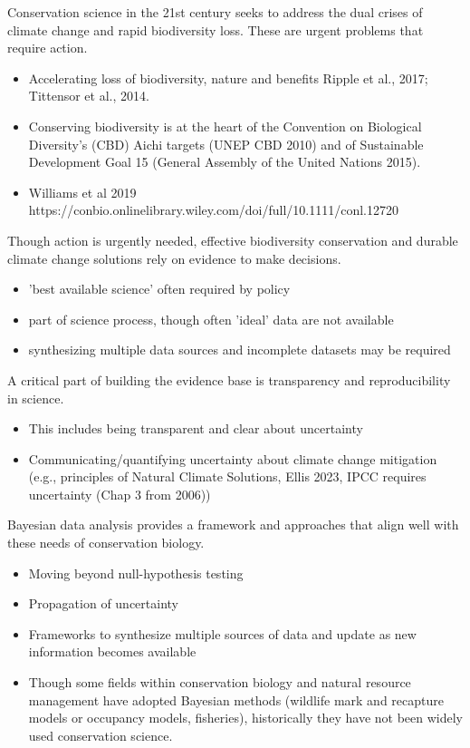 \documentclass{article}
\begin{document}
\par Conservation science in the 21st century seeks to address the dual crises of  climate change and rapid biodiversity loss. These are urgent problems that require action.
\begin{itemize}
\item Accelerating loss of biodiversity, nature and benefits \citep{brondizio2019assessing} Ripple et al., 2017; Tittensor et al., 2014. 
\item Conserving biodiversity is at the heart of the Convention on Biological Diversity's (CBD) Aichi targets (UNEP CBD 2010) and of Sustainable Development Goal 15 (General Assembly of the United Nations 2015).
\item Williams et al 2019 https://conbio.onlinelibrary.wiley.com/doi/full/10.1111/conl.12720
\end{itemize}
\par 
\par Though action is urgently needed, effective biodiversity conservation and durable climate change solutions rely on evidence to make decisions. 
\begin{itemize}
\item 'best available science' often required by  policy
\item part of science process, though often 'ideal' data are not available
\item synthesizing multiple data sources  and incomplete datasets may be required 
\end{itemize}

\par 
\par A critical part of building the evidence base is transparency and reproducibility in science. 
\begin{itemize}
\item This includes being transparent and clear about uncertainty
\item Communicating/quantifying uncertainty about climate change mitigation (e.g., principles of Natural Climate Solutions, Ellis 2023, IPCC requires uncertainty (Chap 3 from 2006))

\end{itemize}
\par 
\par Bayesian data analysis provides a framework and approaches that align well with these needs of conservation biology.

\begin{itemize}

\item Moving beyond null-hypothesis testing 
\item Propagation of uncertainty
\item Frameworks to synthesize multiple sources of data and update as new information becomes available
\item Though some fields within conservation biology and natural resource management have adopted Bayesian methods (wildlife mark and recapture models or occupancy models, fisheries), historically they have not been widely used conservation science.

\end{itemize}
\end{document}

